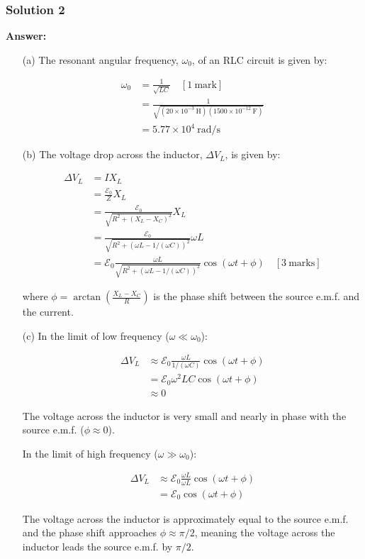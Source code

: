 \documentclass{article}
\begin{document}
\subsubsection{Solution 2}
\textbf{Answer:}

\begin{enumerate}
\item[(a)] The resonant angular frequency, $\omega_0$, of an RLC circuit is given by:

\begin{align*}
\omega_0 &= \frac{1}{\sqrt{LC}} \quad [1~\mathrm{mark}]\\
&= \frac{1}{\sqrt{(20 \times 10^{-3}~\mathrm{H})(1500 \times 10^{-12}~\mathrm{F})}} \\
&= 5.77 \times 10^4~\mathrm{rad/s}
\end{align*}

\item[(b)] The voltage drop across the inductor, $\Delta V_L$, is given by:

\begin{align*}
\Delta V_L &= I X_L  \\
&= \frac{\mathcal{E}_0}{Z} X_L \\
&= \frac{\mathcal{E}_0}{\sqrt{R^2 + (X_L - X_C)^2}} X_L \\
&= \frac{\mathcal{E}_0}{\sqrt{R^2 + (\omega L - 1/(\omega C))^2}} \omega L \\
&= \mathcal{E}_0 \frac{\omega L}{\sqrt{R^2 + (\omega L - 1/(\omega C))^2}} \cos(\omega t + \phi) \quad [3~\mathrm{marks}]
\end{align*}

where $\phi = \arctan \left( \frac{X_L - X_C}{R} \right)$ is the phase shift between the source e.m.f. and the current.

\item[(c)] In the limit of low frequency ($\omega \ll \omega_0$):

\begin{align*}
\Delta V_L &\approx \mathcal{E}_0 \frac{\omega L}{1/(\omega C)} \cos(\omega t + \phi) \\
&= \mathcal{E}_0 \omega^2 LC \cos(\omega t + \phi) \\
&\approx 0
\end{align*}

The voltage across the inductor is very small and nearly in phase with the source e.m.f. ($\phi \approx 0$).

In the limit of high frequency ($\omega \gg \omega_0$):

\begin{align*}
\Delta V_L &\approx \mathcal{E}_0 \frac{\omega L}{\omega L} \cos(\omega t + \phi) \\
&= \mathcal{E}_0 \cos(\omega t + \phi)
\end{align*}

The voltage across the inductor is approximately equal to the source e.m.f. and the phase shift approaches $\phi \approx \pi/2$, meaning the voltage across the inductor leads the source e.m.f. by $\pi/2$. 
\end{enumerate}
\end{document}
